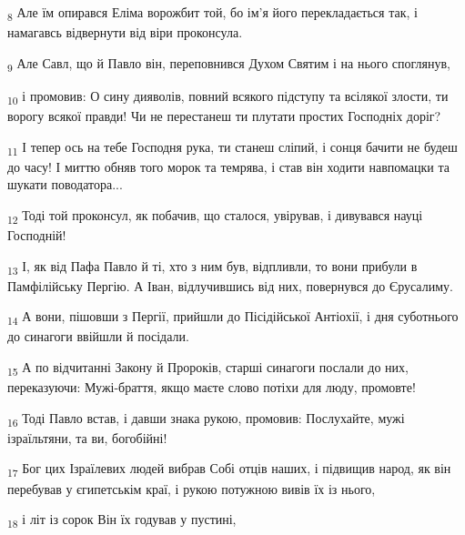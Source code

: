 \begin{tcolorbox}
\textsubscript{8} Але їм опирався Еліма ворожбит той, бо ім'я його перекладається так, і намагавсь відвернути від віри проконсула.
\end{tcolorbox}
\begin{tcolorbox}
\textsubscript{9} Але Савл, що й Павло він, переповнився Духом Святим і на нього споглянув,
\end{tcolorbox}
\begin{tcolorbox}
\textsubscript{10} і промовив: О сину дияволів, повний всякого підступу та всілякої злости, ти ворогу всякої правди! Чи не перестанеш ти плутати простих Господніх доріг?
\end{tcolorbox}
\begin{tcolorbox}
\textsubscript{11} І тепер ось на тебе Господня рука, ти станеш сліпий, і сонця бачити не будеш до часу! І миттю обняв того морок та темрява, і став він ходити навпомацки та шукати поводатора...
\end{tcolorbox}
\begin{tcolorbox}
\textsubscript{12} Тоді той проконсул, як побачив, що сталося, увірував, і дивувався науці Господній!
\end{tcolorbox}
\begin{tcolorbox}
\textsubscript{13} І, як від Пафа Павло й ті, хто з ним був, відпливли, то вони прибули в Памфілійську Пергію. А Іван, відлучившись від них, повернувся до Єрусалиму.
\end{tcolorbox}
\begin{tcolorbox}
\textsubscript{14} А вони, пішовши з Пергії, прийшли до Пісідійської Антіохії, і дня суботнього до синагоги ввійшли й посідали.
\end{tcolorbox}
\begin{tcolorbox}
\textsubscript{15} А по відчитанні Закону й Пророків, старші синагоги послали до них, переказуючи: Мужі-браття, якщо маєте слово потіхи для люду, промовте!
\end{tcolorbox}
\begin{tcolorbox}
\textsubscript{16} Тоді Павло встав, і давши знака рукою, промовив: Послухайте, мужі ізраїльтяни, та ви, богобійні!
\end{tcolorbox}
\begin{tcolorbox}
\textsubscript{17} Бог цих Ізраїлевих людей вибрав Собі отців наших, і підвищив народ, як він перебував у єгипетськім краї, і рукою потужною вивів їх із нього,
\end{tcolorbox}
\begin{tcolorbox}
\textsubscript{18} і літ із сорок Він їх годував у пустині,
\end{tcolorbox}
